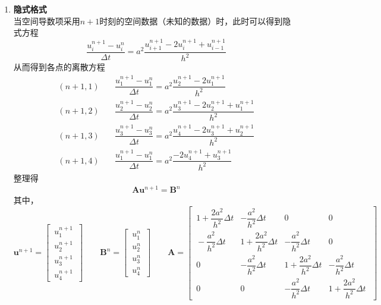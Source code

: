 \begin{enumerate}[\hspace*{2em} (1) ]
	\item \textbf{隐式格式}\\
	当空间导数项采用$n+1$时刻的空间数据（未知的数据）时，此时可以得到隐式方程
	\begin{equation}
		\dfrac{u_i^{n+1}-u_i^n}{\Delta t} = a^2 \dfrac{u_{i+1}^{n+1} - 2u_i^{n+1} + u_{i-1}^{n+1}}{h^2}
	\end{equation}
	从而得到各点的离散方程
	\begin{align*}
		(n+1,1)\quad &\dfrac{u_1^{n+1}-u_1^n}{\Delta t} = a^2 \dfrac{u_{2}^{n+1} - 2u_1^{n+1} }{h^2}\\[0.5em]
		(n+1,2)\quad &\dfrac{u_2^{n+1}-u_2^n}{\Delta t} = a^2 \dfrac{u_{3}^{n+1} - 2u_2^{n+1} + u_1^{n+1}}{h^2}\\[0.5em]
		(n+1,3)\quad &\dfrac{u_3^{n+1}-u_3^n}{\Delta t} = a^2 \dfrac{u_{4}^{n+1} - 2u_3^{n+1} + u_2^{n+1}}{h^2}\\[0.5em]
		(n+1,4)\quad &\dfrac{u_1^{n+1}-u_1^n}{\Delta t} = a^2 \dfrac{- 2u_4^{n+1} + u_3^{n+1}}{h^2}
	\end{align*}
	整理得
	\begin{align}
		\bm{A}\bm{u}^{n+1} = \bm{B}^n
	\end{align}
	其中，
	\begin{equation}
		\bm{u}^{n+1} = 
		\begin{bmatrix}
			\, u_1^{n+1}\, \\
			\, u_2^{n+1}\, \\
			\, u_3^{n+1}\, \\
			\, u_4^{n+1}\,
		\end{bmatrix}
		\quad \quad
		\bm{B}^n = 
		\begin{bmatrix}
			\, u_1^{n}\, \\
			\, u_2^{n}\, \\
			\, u_3^{n}\, \\
			\, u_4^{n}\,
		\end{bmatrix}
		\quad \quad 
		\bm{A} =
		\begin{bmatrix}
			\, 1+\dfrac{2a^2}{h^2}\Delta t & -\dfrac{a^2}{h^2}\Delta t & 0 & 0\,\, \\[1em]
			\, -\dfrac{a^2}{h^2} \Delta t & 1+\dfrac{2a^2}{h^2}\Delta t & -\dfrac{a^2}{h^2}\Delta t & 0 \,\, \\[1em]
			\, 0 & -\dfrac{a^2}{h^2}\Delta t  & 1+\dfrac{2a^2}{h^2}\Delta t & -\dfrac{a^2}{h^2}\Delta t \,\, \\[1em]
			\, 0 & 0 & -\dfrac{a^2}{h^2}\Delta t  &1+\dfrac{2a^2}{h^2}\Delta t \,\,
		\end{bmatrix}
	\end{equation}
\end{enumerate}
